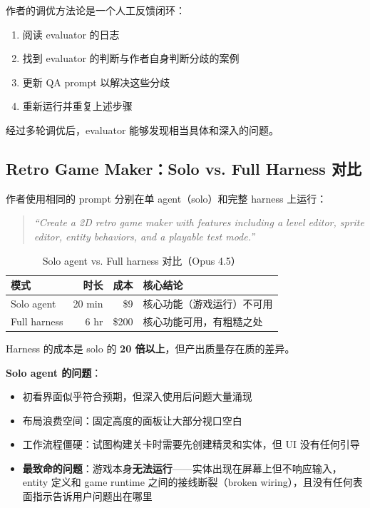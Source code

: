 \documentclass[a4paper]{article}
\begin{document}
作者的调优方法论是一个人工反馈闭环：

\begin{enumerate}[leftmargin=1.5em]
    \item 阅读 evaluator 的日志
    \item 找到 evaluator 的判断与作者自身判断分歧的案例
    \item 更新 QA prompt 以解决这些分歧
    \item 重新运行并重复上述步骤
\end{enumerate}

经过多轮调优后，evaluator 能够发现相当具体和深入的问题。

\subsection{Retro Game Maker：Solo vs. Full Harness 对比}

作者使用相同的 prompt 分别在单 agent（solo）和完整 harness 上运行：

\begin{quote}
\textit{``Create a 2D retro game maker with features including a level editor, sprite editor, entity behaviors, and a playable test mode.''}
\end{quote}

\begin{table}[H]
\centering
\renewcommand{\arraystretch}{1.3}
\begin{tabular}{lrrl}
\toprule
\textbf{模式} & \textbf{时长} & \textbf{成本} & \textbf{核心结论} \\
\midrule
Solo agent & 20 min & \$9 & 核心功能（游戏运行）不可用 \\
Full harness & 6 hr & \$200 & 核心功能可用，有粗糙之处 \\
\bottomrule
\end{tabular}
\caption{Solo agent vs. Full harness 对比（Opus 4.5）}
\end{table}

Harness 的成本是 solo 的 \textbf{20 倍以上}，但产出质量存在质的差异。

\textbf{Solo agent 的问题}：
\begin{itemize}[leftmargin=1.5em]
    \item 初看界面似乎符合预期，但深入使用后问题大量涌现
    \item 布局浪费空间：固定高度的面板让大部分视口空白
    \item 工作流程僵硬：试图构建关卡时需要先创建精灵和实体，但 UI 没有任何引导
    \item \textbf{最致命的问题}：游戏本身\textbf{无法运行}——实体出现在屏幕上但不响应输入，entity 定义和 game runtime 之间的接线断裂（broken wiring），且没有任何表面指示告诉用户问题出在哪里
\end{itemize}
\end{document}

